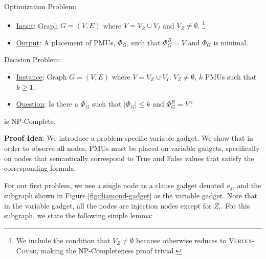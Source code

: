 \full Optimization Problem:
\begin{itemize}
	\item \underline{Input}: Graph $G=(V,E)$ where $V=V_Z \cup V_I$ and $V_Z \neq \emptyset$.
	{\footnote {\small We include the condition that $V_Z \neq \emptyset$ because otherwise \full reduces to \textsc{Vertex-Cover}, making the NP-Completeness
	proof trivial.}}

	\item \underline{Output}: A placement of PMUs, $\Phi_G$, such that $\Phi^R_G=V$ and $\Phi_G$ is minimal.
\end{itemize}

\full Decision Problem:
\begin{itemize}
	\item \underline{Instance}: Graph $G=(V,E)$ where $V=V_Z \cup V_I$, $V_Z \neq \emptyset$, $k$ PMUs such that $k \geq 1$.

	\item \underline{Question}: Is there a $\Phi_G$ such that $|\Phi_G| \leq k$ and $\Phi^R_G = V$?
\end{itemize}


\begin{theorem}
\full is NP-Complete. %
\label{thm:npc-full}
\end{theorem}

{\bf Proof Idea}:  We introduce a problem-specific variable gadget. We show that in order to observe all nodes, PMUs must be placed on variable gadgets, specifically on
nodes that semantically correspond to True and False values that satisfy the corresponding \sat formula. 

For our first problem, we use a single node as a clause gadget denoted $a_j$, and the subgraph shown in Figure \ref{fig:diamond-gadget} as the variable gadget. Note that in the variable gadget, all the nodes are injection nodes except for $Z_i$. For this subgraph, we state the following simple lemma:


